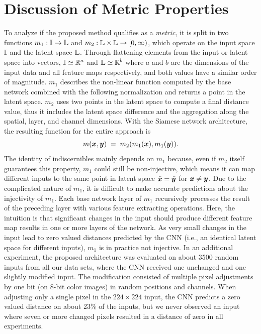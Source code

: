 \section{Discussion of Metric Properties} \label{append: metric properties}
To analyze if the proposed method qualifies as a \emph{metric}, it is split in two functions $m_1 : {\mathbb{I}} \to {\mathbb{L}}$ and $m_2 : {\mathbb{L}} \times {\mathbb{L}} \to [0, \infty)$, which operate on the input space ${\mathbb{I}}$ and the latent space ${\mathbb{L}}$. Through flattening elements from the input or latent space into vectors, ${\mathbb{I}} \simeq {\mathbb{R}}^a$ and ${\mathbb{L}} \simeq {\mathbb{R}}^b$ where $a$ and $b$ are the dimensions of the input data and all feature maps respectively, and both values have a similar order of magnitude. $m_1$ describes the non-linear function computed by the base network combined with the following normalization and returns a point in the latent space. $m_2$ uses two points in the latent space to compute a final distance value, thus it includes the latent space difference and the aggregation along the spatial, layer, and channel dimensions. With the Siamese network architecture, the resulting function for the entire approach is
\begin{equation*}
    m({\bm{x}},{\bm{y}}) \;=\; m_2( m_1({\bm{x}}), m_1({\bm{y}}) ).
\end{equation*}
The identity of indiscernibles mainly depends on $m_1$ because, even if $m_2$ itself guarantees this property, $m_1$ could still be non-injective, which means it can map different inputs to the same point in latent space $\tilde{{\bm{x}}} = \tilde{{\bm{y}}}$ for ${\bm{x}} \neq {\bm{y}}$. Due to the complicated nature of $m_1$, it is difficult to make accurate predictions about the injectivity of $m_1$. Each base network layer of $m_1$ recursively processes the result of the preceding layer with various feature extracting operations. Here, the intuition is that significant changes in the input should produce different feature map results in one or more layers of the network. As very small changes in the input lead to zero valued distances predicted by the CNN (i.e., an identical latent space for different inputs), $m_1$ is in practice not injective. In an additional experiment, the proposed architecture was evaluated on about 3500 random inputs from all our data sets, where the CNN received one unchanged and one slightly modified input. The modification consisted of multiple pixel adjustments by one bit (on 8-bit color images) in random positions and channels. When adjusting only a single pixel in the $224\times224$ input, the CNN predicts a zero valued distance on about 23\% of the inputs, but we never observed an input where seven or more changed pixels resulted in a distance of zero in all experiments. 

